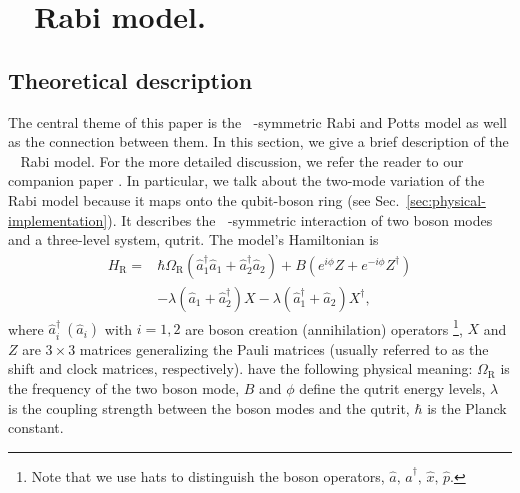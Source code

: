 \documentclass[reprint, aps, prx, amsmath, amssymb, longbibliography, superscriptaddress]{revtex4-2}
\DeclareMathOperator{\Zthree}{\mathbb{Z}_3}
\begin{document}
\section{\texorpdfstring{$\Zthree$}{Z\_3} Rabi model.}
\label{sec:z3-rabi}

\subsection{Theoretical description}
\label{sec:rabi-theory}

The central theme of this paper is the $\Zthree$-symmetric Rabi and Potts model as well as the connection between them. In this section, we give a brief description of the $\Zthree$ Rabi model. For the more detailed discussion, we refer the reader to our companion paper \cite{lotkov_cat_2025b}. In particular, we talk about the two-mode variation of the $\Zthree$ Rabi model because it maps onto the qubit-boson ring (see Sec.~\ref{sec:physical-implementation}). It describes the $\Zthree$-symmetric interaction of two boson modes and a three-level system, qutrit. The model's Hamiltonian is
\begin{equation}
\label{eq:2-mode-z3-Rabi}
\begin{aligned}
     H_{\text{R}} = &\hbar \Omega_{\text{R}} (\hat a_1^{\dagger} \hat a_1 + \hat a_2^{\dagger} \hat a_2) + B (e^{i\phi} Z + e^{-i\phi} Z^{\dagger}) \\
    &- \lambda (\hat a_1 + \hat a_2^{\dagger}) X - \lambda (\hat a_1^{\dagger} + \hat a_2) X^{\dagger},
\end{aligned}
\end{equation}
where $\hat a_i^{\dagger}\  (\hat a_i)$ with $i = 1,2$ are boson creation (annihilation) operators \footnote{Note that we use hats to distinguish the boson operators, $\hat a,\, \hat a^{\dagger},\, \hat x, \,\hat p$.}, $X$ and $Z$ are $3\times 3 $ matrices generalizing the Pauli matrices (usually referred to as the shift and clock matrices, respectively). have the following physical meaning: $\Omega_{\text{R}}$ is the frequency of the two boson mode, $B$ and $\phi$ define the qutrit energy levels, $\lambda$ is the coupling strength between the boson modes and the qutrit, $\hbar$ is the Planck constant.
\end{document}
